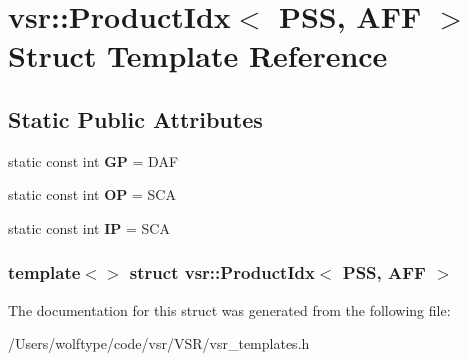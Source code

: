 \hypertarget{structvsr_1_1_product_idx_3_01_p_s_s_00_01_a_f_f_01_4}{\section{vsr\-:\-:Product\-Idx$<$ P\-S\-S, A\-F\-F $>$ Struct Template Reference}
\label{structvsr_1_1_product_idx_3_01_p_s_s_00_01_a_f_f_01_4}
}
\subsection*{Static Public Attributes}
\begin{DoxyCompactItemize}
\item 
\hypertarget{structvsr_1_1_product_idx_3_01_p_s_s_00_01_a_f_f_01_4_a2b5e6ff97a990b2a7f03fbd4302afb8b}{static const int {\bfseries G\-P} = D\-A\-F}\label{structvsr_1_1_product_idx_3_01_p_s_s_00_01_a_f_f_01_4_a2b5e6ff97a990b2a7f03fbd4302afb8b}

\item 
\hypertarget{structvsr_1_1_product_idx_3_01_p_s_s_00_01_a_f_f_01_4_a48ebceb99abb88fdca554f35a00af11b}{static const int {\bfseries O\-P} = S\-C\-A}\label{structvsr_1_1_product_idx_3_01_p_s_s_00_01_a_f_f_01_4_a48ebceb99abb88fdca554f35a00af11b}

\item 
\hypertarget{structvsr_1_1_product_idx_3_01_p_s_s_00_01_a_f_f_01_4_a000d52b1a6c91e469b809950cd573196}{static const int {\bfseries I\-P} = S\-C\-A}\label{structvsr_1_1_product_idx_3_01_p_s_s_00_01_a_f_f_01_4_a000d52b1a6c91e469b809950cd573196}

\end{DoxyCompactItemize}
\subsubsection*{template$<$$>$ struct vsr\-::\-Product\-Idx$<$ P\-S\-S, A\-F\-F $>$}



The documentation for this struct was generated from the following file\-:\begin{DoxyCompactItemize}
\item 
/\-Users/wolftype/code/vsr/\-V\-S\-R/vsr\-\_\-templates.\-h\end{DoxyCompactItemize}
